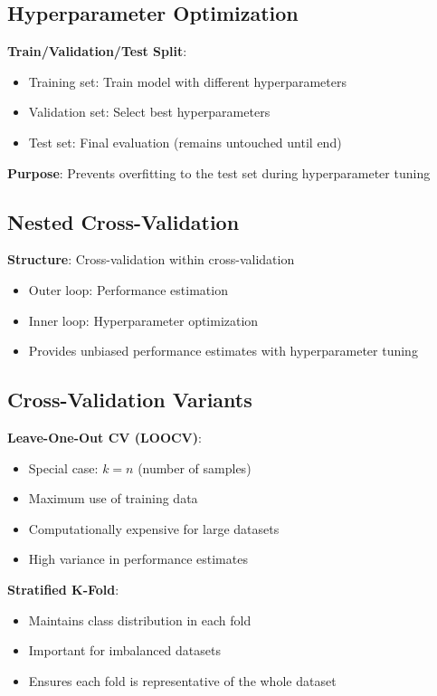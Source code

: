 \documentclass{article}
\begin{document}
\subsection{Hyperparameter Optimization}

\textbf{Train/Validation/Test Split}:
\begin{itemize}
    \item Training set: Train model with different hyperparameters
    \item Validation set: Select best hyperparameters
    \item Test set: Final evaluation (remains untouched until end)
\end{itemize}

\textbf{Purpose}: Prevents overfitting to the test set during hyperparameter tuning

\subsection{Nested Cross-Validation}

\textbf{Structure}: Cross-validation within cross-validation
\begin{itemize}
    \item Outer loop: Performance estimation
    \item Inner loop: Hyperparameter optimization
    \item Provides unbiased performance estimates with hyperparameter tuning
\end{itemize}

\subsection{Cross-Validation Variants}

\textbf{Leave-One-Out CV (LOOCV)}:
\begin{itemize}
    \item Special case: $k = n$ (number of samples)
    \item Maximum use of training data
    \item Computationally expensive for large datasets
    \item High variance in performance estimates
\end{itemize}

\textbf{Stratified K-Fold}:
\begin{itemize}
    \item Maintains class distribution in each fold
    \item Important for imbalanced datasets
    \item Ensures each fold is representative of the whole dataset
\end{itemize}
\end{document}
